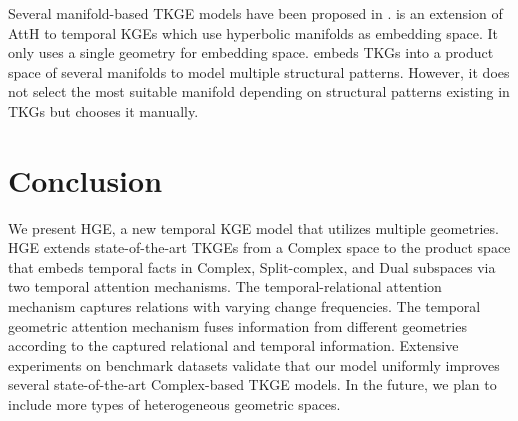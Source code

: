\documentclass[letterpaper]{article} %
\begin{document}
Several manifold-based TKGE models have been proposed in \cite{herculemontella2021hyperbolic,han2020dyernie}.
\cite{herculemontella2021hyperbolic} is an extension of AttH \cite{chami2020low} to temporal KGEs which use hyperbolic manifolds as embedding space. It only uses a single geometry for embedding space.
\cite{han2020dyernie} embeds TKGs into a product space of several manifolds to model multiple structural patterns. However, it does not select the most suitable manifold depending on structural patterns existing in TKGs but chooses it manually.




\section{Conclusion}
We present HGE, a new temporal KGE model that utilizes multiple geometries. HGE extends state-of-the-art TKGEs from a Complex space to the product space that embeds temporal facts in Complex, Split-complex, and Dual subspaces via two temporal attention mechanisms. The temporal-relational attention mechanism captures relations with varying change frequencies. The temporal geometric attention mechanism fuses information from different geometries according to the captured relational and temporal information. Extensive experiments on benchmark datasets validate that our model uniformly improves several state-of-the-art Complex-based TKGE models. In the future, we plan to include more types of heterogeneous geometric spaces.

\end{document}
